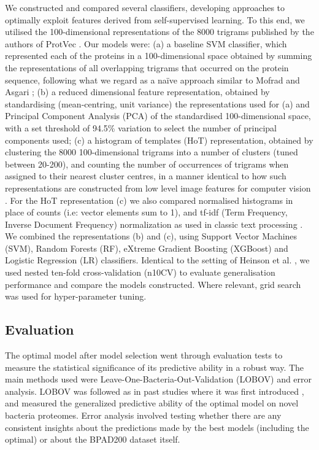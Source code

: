 \documentclass[10pt,journal,compsoc,twoside]{IEEEtran}
\begin{document}
We constructed and compared several classifiers, developing approaches to optimally exploit features derived from self-supervised learning. To this end, we utilised the 100-dimensional representations of the 8000 trigrams published by the authors of ProtVec \cite{protvec}. Our models were: (a) a baseline SVM classifier, which represented each of the proteins in a 100-dimensional space obtained by summing the representations of all overlapping trigrams that occurred on the protein sequence, following what we regard as a naïve approach similar to Mofrad and Asgari \cite{protvec}; (b) a reduced dimensional feature representation, obtained by standardising (mean-centring, unit variance) the representations used for (a) and Principal Component Analysis (PCA) of the standardised 100-dimensional space, with a set threshold of 94.5\% variation to select the number of principal components used; (c) a histogram of templates (HoT) representation, obtained by clustering the 8000 100-dimensional trigrams into a number of clusters (tuned between 20-200), and counting the number of occurrences of trigrams when assigned to their nearest cluster centres, in a manner identical to how such representations are constructed from low level image features for computer vision \cite{bovw-computer-vision}. For the HoT representation (c) we also compared normalised histograms in place of counts (i.e: vector elements sum to 1), and tf-idf (Term Frequency, Inverse Document Frequency) normalization as used in classic text processing \cite{tf-idf}. We combined the representations (b) and (c), using Support Vector Machines (SVM), Random Forests (RF), eXtreme Gradient Boosting (XGBoost) and Logistic Regression (LR) classifiers. Identical to the setting of Heinson et al. \cite{heinson_2017}, we used nested ten-fold cross-validation (n10CV) to evaluate generalisation performance and compare the models constructed. Where relevant, grid search was used for hyper-parameter tuning. 


\subsection{Evaluation}
\label{sec:methods3}

The optimal model after model selection went through evaluation tests to measure the statistical significance of its predictive ability in a robust way. The main methods used were Leave-One-Bacteria-Out-Validation (LOBOV) and error analysis. LOBOV was followed as in past studies where it was first introduced \cite{heinson_2019}, and measured the generalized predictive ability of the optimal model on novel bacteria proteomes. Error analysis involved testing whether there are any consistent insights about the predictions made by the best models (including the optimal) or about the BPAD200 dataset itself.
\end{document}
